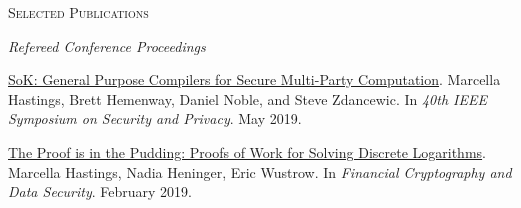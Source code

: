 \documentclass{article}
\begin{document}
\textsc{Selected Publications} \hrulefill

\textit{Refereed Conference Proceedings}
\begin{enumerate}[label={[\arabic*]}]
\item \href{https://scholar.google.com/citations?view_op=view_citation&hl=en&user=IwKeLxkAAAAJ&citation_for_view=IwKeLxkAAAAJ:9yKSN-GCB0IC}{SoK: General Purpose Compilers for Secure Multi-Party Computation}. 
Marcella Hastings, Brett Hemenway, Daniel Noble, and Steve Zdancewic.
In \textit{40th IEEE Symposium on Security and Privacy}. May 2019.
\item \href{https://scholar.google.com/citations?view_op=view_citation&hl=en&user=IwKeLxkAAAAJ&citation_for_view=IwKeLxkAAAAJ:d1gkVwhDpl0C}{The Proof is in the Pudding: Proofs of Work for Solving Discrete Logarithms}.
Marcella Hastings, Nadia Heninger, Eric Wustrow.
In \emph{Financial Cryptography and Data Security}. February 2019.
\end{enumerate}
\end{document}
